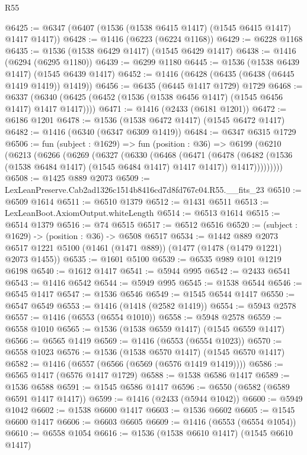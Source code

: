 \begin{lexlean}{R55}
\begin{coremodule}
{{@6425 := @6347 (@6407 (@1536 (@1538 @6415 @1417) (@1545 @6415 @1417) @1417 @1417))
@6428 := @1416 (@6223 (@6224 @1168))
@6429 := @6228 @1168
@6435 := @1536 (@1538 @6429 @1417) (@1545 @6429 @1417)
@6438 := @1416 (@6294 (@6295 @1180))
@6439 := @6299 @1180
@6445 := @1536 (@1538 @6439 @1417) (@1545 @6439 @1417)
@6452 := @1416 (@6428 (@6435 (@6438 (@6445 @1419 @1419)) @1419))
@6456 := @6435 (@6445 @1417 @1729) @1729
@6468 := @6337 (@6340 (@6425 (@6452 (@1536 (@1538 @6456 @1417) (@1545 @6456 @1417) @1417 @1417))))
@6471 := @1416 (@2433 (@6181 @1201))
@6472 := @6186 @1201
@6478 := @1536 (@1538 @6472 @1417) (@1545 @6472 @1417)
@6482 := @1416 (@6340 (@6347 @6309 @1419))
@6484 := @6347 @6315 @1729
@6506 := fun (subject : @1629) =>
  fun (position : @36) =>
  @6199
    (@6210
      (@6213
        (@6266
          (@6269
            (@6327
              (@6330
                (@6468
                  (@6471
                    (@6478
                      (@6482 (@1536 (@1538 @6484 @1417) (@1545 @6484 @1417) @1417 @1417))
                      @1417)))))))))
@6508 := @1425 @889 @2073
@6509 := LexLeanPreserve.Cab2ad1326c1514b8416cd7d8fd767c04.R55.__fits_23
@6510 := @6509 @1614
@6511 := @6510 @1379
@6512 := @1431 @6511
@6513 := LexLeanBoot.AxiomOutput.whiteLength
@6514 := @6513 @1614
@6515 := @6514 @1379
@6516 := @74 @6515
@6517 := @6512 @6516
@6520 := (subject : @1629) -> (position : @36) -> @6508 @6517
@6534 := @1442
    @889
    @2073
    @6517
    @1221
    @5100
    (@1461 (@1471 @889))
    (@1477 (@1478 (@1479 @1221) @2073 @1455))
@6535 := @1601 @5100
@6539 := @6535 @989 @101 @1219 @6198
@6540 := @1612 @1417
@6541 := @5944 @995
@6542 := @2433 @6541
@6543 := @1416 @6542
@6544 := @5949 @995
@6545 := @1538 @6544
@6546 := @6545 @1417
@6547 := @1536 @6546
@6549 := @1545 @6544 @1417
@6550 := @6547 @6549
@6553 := @1416 (@1418 (@2582 @1419))
@6554 := @5943 @2578
@6557 := @1416 (@6553 (@6554 @1010))
@6558 := @5948 @2578
@6559 := @6558 @1010
@6565 := @1536 (@1538 @6559 @1417) (@1545 @6559 @1417)
@6566 := @6565 @1419
@6569 := @1416 (@6553 (@6554 @1023))
@6570 := @6558 @1023
@6576 := @1536 (@1538 @6570 @1417) (@1545 @6570 @1417)
@6582 := @1416 (@6557 (@6566 (@6569 (@6576 @1419 @1419))))
@6586 := @6565 @1417 (@6576 @1417 @1729)
@6588 := @1538 @6586 @1417
@6589 := @1536 @6588
@6591 := @1545 @6586 @1417
@6596 := @6550 (@6582 (@6589 @6591 @1417 @1417))
@6599 := @1416 (@2433 (@5944 @1042))
@6600 := @5949 @1042
@6602 := @1538 @6600 @1417
@6603 := @1536 @6602
@6605 := @1545 @6600 @1417
@6606 := @6603 @6605
@6609 := @1416 (@6553 (@6554 @1054))
@6610 := @6558 @1054
@6616 := @1536 (@1538 @6610 @1417) (@1545 @6610 @1417)
}}
\end{coremodule}
\end{lexlean}
